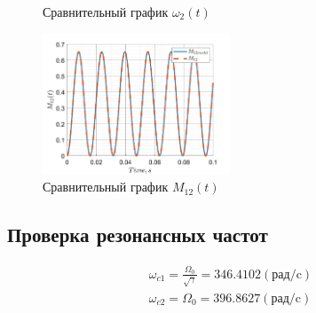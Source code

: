 \begin{figure}[!h]
\begin{minipage}{0.5\textwidth}
        \caption{Сравнительный график $\omega_2(t)$}
    \end{minipage}\label{fig:figure4}%
\end{figure}

\begin{figure}[!h]
    \centering
    \includegraphics[width=0.5\textwidth]{img/all_M12}
    \caption{Сравнительный график $M_{12}(t)$}
    \label{fig:all_M}
\end{figure}

\newpage
\subsection{Проверка резонансных частот}
\begin{gather*}
    \omega_{c1} = \frac{\Omega_0}{\sqrt{\gamma}} = 346.4102 (\text{рад/c})\\
    \omega_{c2} = \Omega_0= 396.8627 (\text{рад/c})
\end{gather*}

